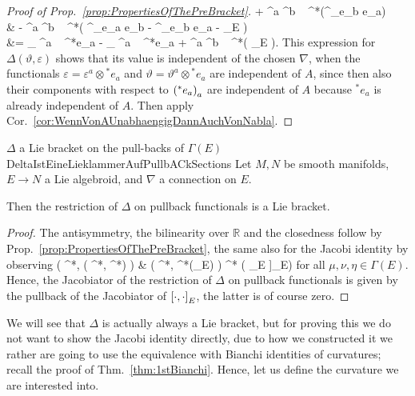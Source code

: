 \begin{proof}[Proof of Prop.~\ref{prop:PropertiesOfThePreBracket}]
	+ \varepsilon^a \vartheta^b ~ {}^*\mleft(\nabla^{}_{e_b} e_a\mright)
\\
&\hspace{1cm}
	- \vartheta^a \varepsilon^b ~ {}^*\mleft( 
	\nabla^{}_{e_a} e_b 
	- \nabla^{}_{e_b} e_a 
	- \mleft[ e_a, e_b \mright]_E
	\mright) \\
&=
\delta_{\varepsilon} \vartheta^a ~ {}^*e_a
	- \delta_{\vartheta} \varepsilon^a ~ {}^*e_a
	+ \vartheta^a \varepsilon^b ~ 
	{}^*\bigl( 
		\mleft[ e_a, e_b \mright]_E
	\bigr).
\eas
This expression for $\Delta(\vartheta, \varepsilon)$ shows that its value is independent of the chosen $\nabla$, when the functionals $\varepsilon = \varepsilon^a \otimes {}^*e_a$ and $\vartheta= \vartheta^a \otimes {}^*e_a$ are independent of $A$, since then also their components with respect to $\mleft({}^*e_a\mright)_a$ are independent of $A$ because ${}^*e_a$ is already independent of $A$. Then apply Cor.~\ref{cor:WennVonAUnabhaengigDannAuchVonNabla}.
\end{proof}

\begin{corollaries}{$\Delta$ a Lie bracket on the pull-backs of $\Gamma(E)$}{DeltaIstEineLieklammerAufPullbACkSections}
Let $M, N$ be smooth manifolds, $E \to N$ a Lie algebroid, and $\nabla$ a connection on $E$.

Then the restriction of $\Delta$ on pullback functionals is a Lie bracket.
\end{corollaries}

\begin{proof}
\leavevmode\newline
The antisymmetry, the bilinearity over $\mathbb{R}$ and the closedness follow by Prop.~\ref{prop:PropertiesOfThePreBracket}, the same also for the Jacobi identity by observing
\bas
\Delta \mleft( {}^*\mu, \Delta \mleft( {}^*\nu, {}^*\eta \mright) \mright)
&
\Delta \mleft( {}^*\mu, {}^*\mleft(\mleft[ \nu,\eta \mright]_E\mright) \mright)
{}^* \mleft( \mleft[ \mu, \mleft[ \nu, \eta \mright]_E \mright]_E\mright)
\eas
for all $\mu, \nu, \eta \in \Gamma(E)$. Hence, the Jacobiator of the restriction of $\Delta$ on pullback functionals is given by the pullback of the Jacobiator of $\mleft[ \cdot, \cdot \mright]_E$, the latter is of course zero.
\end{proof}

We will see that $\Delta$ is actually always a Lie bracket, but for proving this we do not want to show the Jacobi identity directly, due to how we constructed it we rather are going to use the equivalence with Bianchi identities of curvatures; recall the proof of Thm.~\ref{thm:1stBianchi}. Hence, let us define the curvature we are interested into.

